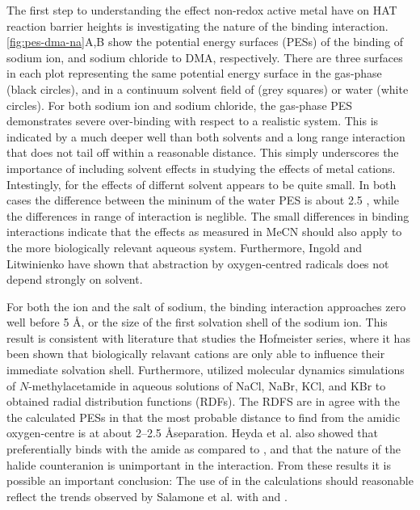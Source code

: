 The first step to understanding the effect non-redox active metal have on HAT reaction barrier heights is investigating the nature of the binding interaction. \ref{fig:pes-dma-na}A,B show the potential energy surfaces (PESs) of the binding of sodium ion, and sodium chloride to DMA, respectively. There are three surfaces in each plot representing the same potential energy surface in the gas-phase (black circles), and in a continuum solvent field of (grey squares) or water (white circles). For both sodium ion and sodium chloride, the gas-phase PES demonstrates severe over-binding with respect to a realistic system. This is indicated by a much deeper well than both solvents and a long range interaction that does not tail off within a reasonable distance. This simply underscores the importance of including solvent effects in studying the effects of metal cations. Intestingly, for the effects of differnt solvent appears to be quite small. In both cases the difference between the mininum of the water PES is about 2.5 \kcalmol, while the differences in range of interaction is neglible. The small differences in binding interactions indicate that the effects as measured in MeCN should also apply to the more biologically relevant aqueous system. Furthermore, Ingold and Litwinienko have shown that  abstraction by oxygen-centred radicals does not depend strongly on solvent.\cite{Litwinienko200}

For both the ion and the salt of sodium, the binding interaction approaches zero well before 5 \AA, or the size of the first solvation shell of the sodium ion.\cite{Degreve1996} This result is consistent with literature that studies the Hofmeister series, where it has been shown that biologically relavant cations are only able to influence their immediate solvation shell.\cite{Omta2003, Funker2011} Furthermore, \citet{Heyda2009} utilized molecular dynamics simulations of $N$-methylacetamide in aqueous solutions of NaCl, NaBr, KCl, and KBr to obtained radial distribution functions (RDFs). The RDFS are in agree with the the calculated PESs in that the most probable distance to find  from the amidic oxygen-centre is at about 2--2.5 \AA separation. Heyda et al. also showed that  preferentially binds with the amide as compared to , and that the nature of the halide counteranion is unimportant in the interaction. From these results it is possible an important conclusion: The use of  in the calculations should reasonable reflect the trends observed by Salamone et al. with  and .

